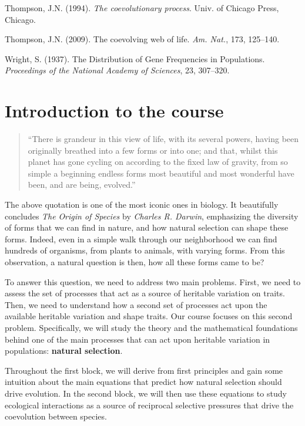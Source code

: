 \documentclass[
]{book}
\begin{document}
Thompson, J.N. (1994). \emph{The coevolutionary process}. Univ. of Chicago Press, Chicago.

Thompson, J.N. (2009). The coevolving web of life. \emph{Am. Nat.}, 173, 125--140.

Wright, S. (1937). The Distribution of Gene Frequencies in Populations. \emph{Proceedings of the National Academy of Sciences}, 23, 307--320.

\hypertarget{introduction-to-the-course}{%
\chapter{Introduction to the course}\label{introduction-to-the-course}}

\begin{quote}
``There is grandeur in this view of life, with its several powers, having been originally breathed into a few forms or into one; and that, whilst this planet has gone cycling on according to the fixed law of gravity, from so simple a beginning endless forms most beautiful and most wonderful have been, and are being, evolved.''
\end{quote}

The above quotation is one of the most iconic ones in biology. It beautifully concludes \emph{The} \emph{Origin of Species} by \emph{Charles R. Darwin}, emphasizing the diversity of forms that we can find in nature, and how natural selection can shape these forms. Indeed, even in a simple walk through our neighborhood we can find hundreds of organisms, from plants to animals, with varying forms. From this observation, a natural question is then, how all these forms came to be?

To answer this question, we need to address two main problems. First, we need to assess the set of processes that act as a source of heritable variation on traits. Then, we need to understand how a second set of processes act upon the available heritable variation and shape traits. Our course focuses on this second problem. Specifically, we will study the theory and the mathematical foundations behind one of the main processes that can act upon heritable variation in populations: \textbf{natural selection}.

Throughout the first block, we will derive from first principles and gain some intuition about the main equations that predict how natural selection should drive evolution. In the second block, we will then use these equations to study ecological interactions as a source of reciprocal selective pressures that drive the coevolution between species.
\end{document}
